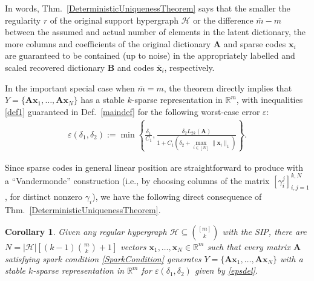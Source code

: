 \documentclass[journal, twocolumn]{IEEEtran}
\newtheorem{corollary}{Corollary}
\begin{document}
In words, Thm.~\ref{DeterministicUniquenessTheorem} says that the smaller the regularity $r$ of the original support hypergraph $\mathcal{H}$ or the difference $\overline m - m$ between the assumed and actual number of elements in the latent dictionary, the more columns and coefficients of the original dictionary $\mathbf{A}$ and sparse codes $\mathbf{x}_i$ are guaranteed to be contained (up to noise) in the appropriately labelled and scaled recovered dictionary $\mathbf{B}$ and codes $\mathbf{\overline x}_i$, respectively. 

In the important special case when $\overline m = m$, the theorem directly implies that  $Y = \{\mathbf{Ax}_1, \ldots, \mathbf{Ax}_N\}$ has a stable $k$-sparse representation in $\mathbb{R}^m$, with inequalities \eqref{def1} guaranteed in Def.~\ref{maindef} for the following worst-case error $\varepsilon$: 
\begin{align}\label{epsdel}
\varepsilon(\delta_1, \delta_2) := \min \left\{ \frac{\delta_1}{ C_1 }, \frac{ \delta_2 L_{2k}(\mathbf{A})}{ 1 + C_1 \left( \delta_2 + \max_{i \in [N]} \|\mathbf{x}_i\|_1  \right) } \right\}.
\end{align}

Since sparse codes in general linear position are straightforward to produce with a ``Vandermonde''  construction (i.e., by choosing columns of the matrix $[\gamma_{i}^j]_{i,j=1}^{k,N}$, for distinct nonzero $\gamma_i$), we have the following direct consequence of Thm.~\ref{DeterministicUniquenessTheorem}.

\begin{corollary}\label{DeterministicUniquenessCorollary}
Given any regular hypergraph $\mathcal{H} \subseteq {[m] \choose k}$ with the SIP, there are $N =  |\mathcal{H}| \left[ (k-1){m \choose k} + 1  \right]$ vectors \mbox{$\mathbf{x}_1, \ldots, \mathbf{x}_N \in \mathbb{R}^m$} such that every matrix $\mathbf{A}$ satisfying spark condition \eqref{SparkCondition} generates $Y = \{\mathbf{A}\mathbf{x}_1, \ldots, \mathbf{A}\mathbf{x}_N\}$ with a stable $k$-sparse representation in $\mathbb{R}^m$ for $\varepsilon(\delta_1,\delta_2)$ given by \eqref{epsdel}.
\end{corollary}
\end{document}
